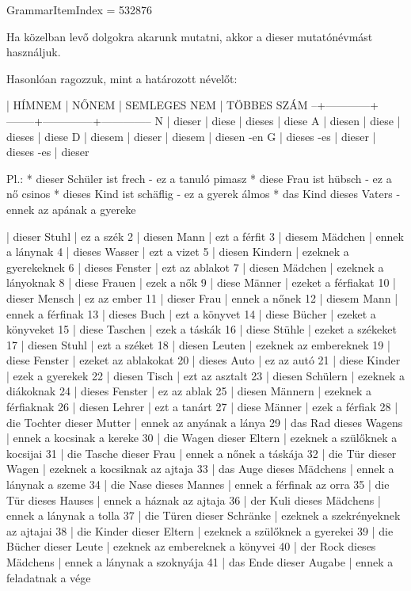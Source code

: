 \documentclass{article}
\newenvironment{desc}{\verbatim}{\endverbatim}
\newenvironment{exmp}{\verbatim}{\endverbatim}
\begin{document}
GrammarItemIndex = 532876

\begin{desc}
Ha közelban levő dolgokra akarunk mutatni, akkor a dieser mutatónévmást használjuk.

Hasonlóan ragozzuk, mint a határozott névelőt:

  | HÍMNEM     | NŐNEM  | SEMLEGES NEM | TÖBBES SZÁM
--+------------+--------+--------------+--------------
N | dieser     | diese  | dieses       | diese
A | diesen     | diese  | dieses       | diese
D | diesem     | dieser | diesem       | diesen -en
G | dieses -es | dieser | dieses -es   | dieser

Pl.: * dieser Schüler ist frech - ez a tanuló pimasz
* diese Frau ist hübsch - ez a nő csinos
* dieses Kind ist schäflig - ez a gyerek álmos
* das Kind dieses Vaters - ennek az apának a gyereke
\end{desc}

\begin{exmp}
1 | dieser Stuhl | ez a szék
2 | diesen Mann | ezt a férfit
3 | diesem Mädchen | ennek a lánynak
4 | dieses Wasser | ezt a vizet
5 | diesen Kindern | ezeknek a gyerekeknek
6 | dieses Fenster | ezt az ablakot
7 | diesen Mädchen | ezeknek a lányoknak
8 | diese Frauen | ezek a nők
9 | diese Männer | ezeket a férfiakat
10 | dieser Mensch | ez az ember
11 | dieser Frau | ennek a nőnek
12 | diesem Mann | ennek a férfinak
13 | dieses Buch | ezt a könyvet
14 | diese Bücher | ezeket a könyveket
15 | diese Taschen | ezek a táskák
16 | diese Stühle | ezeket a székeket
17 | diesen Stuhl | ezt a széket
18 | diesen Leuten | ezeknek az embereknek
19 | diese Fenster | ezeket az ablakokat
20 | dieses Auto | ez az autó
21 | diese Kinder | ezek a gyerekek
22 | diesen Tisch | ezt az asztalt
23 | diesen Schülern | ezeknek a diákoknak
24 | dieses Fenster | ez az ablak
25 | diesen Männern | ezeknek a férfiaknak
26 | diesen Lehrer | ezt a tanárt
27 | diese Männer | ezek a férfiak
28 | die Tochter dieser Mutter | ennek az anyának a lánya
29 | das Rad dieses Wagens | ennek a kocsinak a kereke
30 | die Wagen dieser Eltern | ezeknek a szülőknek a kocsijai
31 | die Tasche dieser Frau | ennek a nőnek a táskája
32 | die Tür dieser Wagen | ezeknek a kocsiknak az ajtaja
33 | das Auge dieses Mädchens | ennek a lánynak a szeme
34 | die Nase dieses Mannes | ennek a férfinak az orra
35 | die Tür dieses Hauses | ennek a háznak az ajtaja
36 | der Kuli dieses Mädchens | ennek a lánynak a tolla
37 | die Türen dieser Schränke | ezeknek a szekrényeknek az ajtajai
38 | die Kinder dieser Eltern | ezeknek a szülőknek a gyerekei
39 | die Bücher dieser Leute | ezeknek az embereknek a könyvei
40 | der Rock dieses Mädchens | ennek a lánynak a szoknyája
41 | das Ende dieser Augabe | ennek a feladatnak a vége
\end{exmp}
\end{document}
